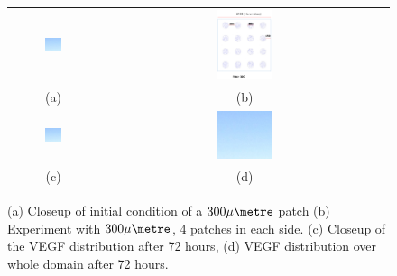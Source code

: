 \begin{figure}
 \begin{center}
  \begin{tabular}{cc}
   \includegraphics[width=0.20\textwidth]{./figures/PatchCloseUp.png} &   \includegraphics[width=0.20\textwidth]{./figures/Patch300.png} \\
   (a) & (b) \\
   \includegraphics[width=0.20\textwidth]{./figures/VEGFCloseUp.png} &  \includegraphics[width=0.20\textwidth]{./figures/VEGF300.png} \\
   (c) & (d)
   \end{tabular}
   \end{center}

\caption{(a) Closeup of initial condition of a $300 \mu \metre$ patch (b) Experiment with $300 \mu \metre$, 4 patches in each side. (c) Closeup of the VEGF distribution after 72 hours, (d) VEGF distribution over whole domain after 72 hours.  }
  \vspace{+1mm}
\label{simulation_examples}
\end{figure}



